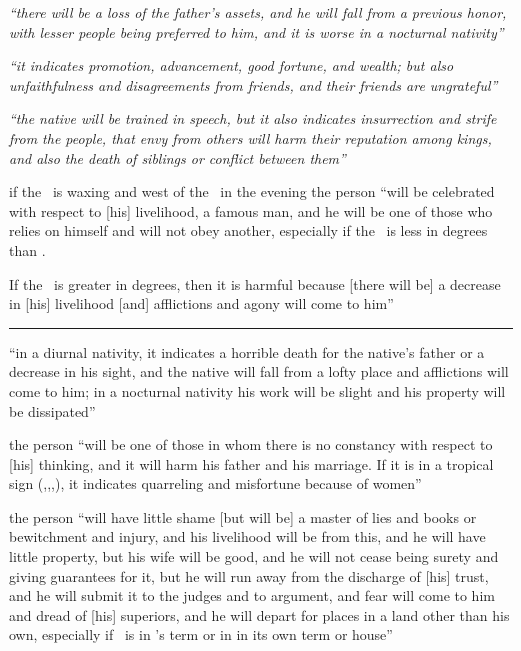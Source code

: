 \begin{description}[style=multiline,leftmargin=1.5cm]
\item[\Jupiter\Opposition\Sun] \textsl{``there will be a loss of the father's assets, and he will fall from a previous honor, with lesser people being preferred to him, and it is worse in a nocturnal nativity''}

\item[\Jupiter\Opposition\Venus] \textsl{``it indicates promotion, advancement, good fortune, and wealth; but also unfaithfulness and disagreements from friends, and their friends are ungrateful''}

\item[\Jupiter\Opposition\Mercury] \textsl{``the native will be trained in speech, but it also indicates insurrection and strife from the people, that envy from others will harm their reputation among kings, and also the death of siblings or conflict between them''}

\item[\Jupiter\Opposition\Moon] if the \Moon\, is waxing and west of the \Sun\, in the evening the person ``will be celebrated with respect to [his] livelihood, a famous man, and he will be one of those who relies on himself and will not obey another, especially if the \Moon\, is less in degrees than \Jupiter. 

If the \Moon\, is greater in degrees, then it is harmful because [there will be] a decrease in [his] livelihood [and] afflictions and agony will come to him''

\vspace{0.5em}\hrule
\item[\Mars\Opposition\Sun] ``in a diurnal nativity, it indicates a horrible death for the native's father or a decrease in his sight, and the native will fall from a lofty place and afflictions will come to him; in a nocturnal nativity his work will be slight and his property will be dissipated''

\item[\Mars\Opposition\Venus] the person ``will be one of those in whom there is no constancy with respect to [his] thinking, and it will harm his father and his marriage. If it is in a tropical sign (\Aries,\Cancer,\Libra,\Capricorn), it indicates quarreling and misfortune because of women''

\item[\Mars\Opposition\Mercury] the person ``will have little shame [but will be] a master of lies and books or bewitchment and injury, and his livelihood will be from this, and he will have little property, but his wife will be good, and he will not cease being surety and giving guarantees for it, but he will run away from the discharge of [his] trust, and he will submit it to the judges and to argument, and fear will come to him and dread of [his] superiors, and he will depart for places in a land other than his own, especially if \Mercury\, is in \Saturn's term or in in its own term or house''


\end{description}

